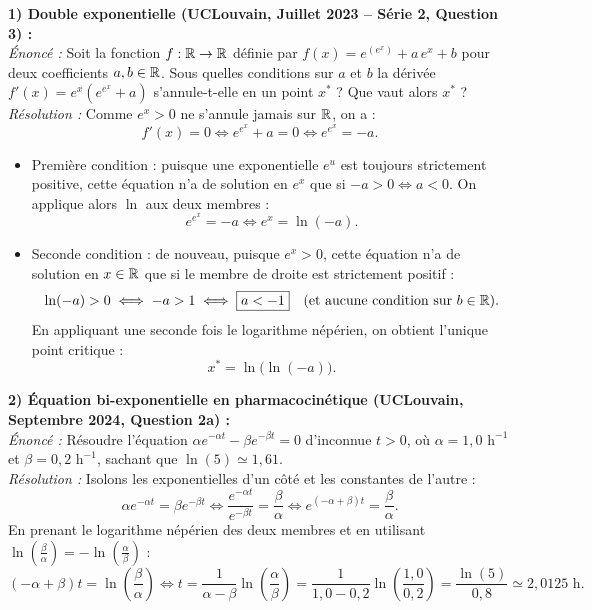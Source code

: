 \begin{exemple}
\textbf{1) Double exponentielle (UCLouvain, Juillet 2023 -- Série 2, Question 3) :}\\
\emph{Énoncé :} Soit la fonction $f : \mathbb{R} \to \mathbb{R}$ définie par $f(x) = e^{(e^x)} + a\,e^x + b$ pour deux coefficients $a, b \in \mathbb{R}$. Sous quelles conditions sur $a$ et $b$ la dérivée $f'(x) = e^x(e^{e^x} + a)$ s'annule-t-elle en un point $x^*$ ? Que vaut alors $x^*$ ?\\
\emph{Résolution :} Comme $e^x > 0$ ne s'annule jamais sur $\mathbb{R}$, on a :
\[
    f'(x) = 0 \iff e^{e^x} + a = 0 \iff e^{e^x} = -a.
\]
\begin{itemize}
    \item Première condition : puisque une exponentielle $e^u$ est toujours strictement positive, cette équation n'a de solution en $e^x$ que si $-a > 0 \iff a < 0$. On applique alors $\ln$ aux deux membres :
    \[
        e^{e^x} = -a \iff e^x = \ln(-a).
    \]
    \item Seconde condition : de nouveau, puisque $e^x > 0$, cette équation n'a de solution en $x \in \mathbb{R}$ que si le membre de droite est strictement positif :
    \[
        \ln(-a) > 0 \iff -a > 1 \iff \boxed{a < -1} \quad (\text{et aucune condition sur } b \in \mathbb{R}).
    \]
    En appliquant une seconde fois le logarithme népérien, on obtient l'unique point critique :
    \[
        \boxed{x^* = \ln\bigl(\ln(-a)\bigr)}.
    \]
\end{itemize}

\medskip
\textbf{2) Équation bi-exponentielle en pharmacocinétique (UCLouvain, Septembre 2024, Question 2a) :}\\
\emph{Énoncé :} Résoudre l'équation $\alpha e^{-\alpha t} - \beta e^{-\beta t} = 0$ d'inconnue $t > 0$, où $\alpha = 1,0\text{ h}^{-1}$ et $\beta = 0,2\text{ h}^{-1}$, sachant que $\ln(5) \simeq 1,61$.\\
\emph{Résolution :} Isolons les exponentielles d'un côté et les constantes de l'autre :
\[
    \alpha e^{-\alpha t} = \beta e^{-\beta t} \iff \frac{e^{-\alpha t}}{e^{-\beta t}} = \frac{\beta}{\alpha} \iff e^{(-\alpha + \beta)t} = \frac{\beta}{\alpha}.
\]
En prenant le logarithme népérien des deux membres et en utilisant $\ln\left(\frac{\beta}{\alpha}\right) = -\ln\left(\frac{\alpha}{\beta}\right)$ :
\[
    (-\alpha + \beta)t = \ln\left(\frac{\beta}{\alpha}\right) \iff t = \frac{1}{\alpha - \beta}\ln\left(\frac{\alpha}{\beta}\right) = \frac{1}{1,0 - 0,2}\ln\left(\frac{1,0}{0,2}\right) = \frac{\ln(5)}{0,8} \simeq 2,0125\text{ h}.
\]
\end{exemple}

